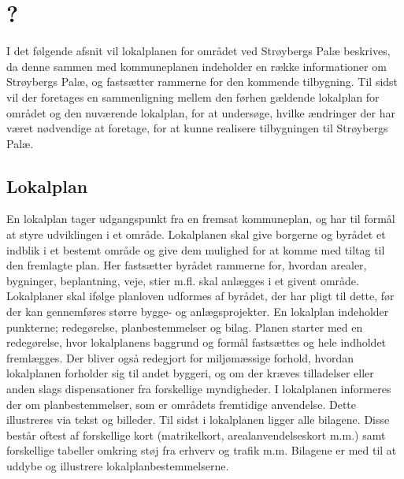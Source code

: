 \chapter{?}
I det følgende afsnit vil lokalplanen for området ved Strøybergs Palæ beskrives, da denne sammen med kommuneplanen indeholder en række informationer om Strøybergs Palæ, og fastsætter rammerne for den kommende tilbygning. 
\newline \indent{     }   Til sidst vil der foretages en sammenligning mellem den førhen gældende lokalplan for området og den nuværende lokalplan, for at undersøge, hvilke ændringer der har været nødvendige at foretage, for at kunne realisere tilbygningen til Strøybergs Palæ.


\section{Lokalplan}
En lokalplan tager udgangspunkt fra en fremsat kommuneplan, og har til formål at styre udviklingen i et område. Lokalplanen skal give borgerne og byrådet et indblik i et bestemt område og give dem mulighed for at komme med tiltag til den fremlagte plan. Her fastsætter byrådet rammerne for, hvordan arealer, bygninger, beplantning, veje, stier m.fl. skal anlægges i et givent område. Lokalplaner skal ifølge planloven udformes af byrådet, der har pligt til dette, før der kan gennemføres større bygge- og anlægsprojekter.
\newline
\newline
En lokalplan indeholder punkterne; redegørelse, planbestemmelser og bilag.
\newline \indent{     }  Planen starter med en redegørelse, hvor lokalplanens baggrund og formål fastsættes og hele indholdet fremlægges. Der bliver også redegjort for miljømæssige forhold, hvordan lokalplanen forholder sig til andet byggeri, og om der kræves tilladelser eller anden slags dispensationer fra forskellige myndigheder.  
\newline \indent{     }   I lokalplanen informeres der om planbestemmelser, som er områdets fremtidige anvendelse. Dette illustreres via tekst og billeder.
\newline \indent{     }  Til sidst i lokalplanen ligger alle bilagene. Disse består oftest af forskellige kort (matrikelkort, arealanvendelseskort m.m.) samt forskellige tabeller omkring støj fra erhverv og trafik m.m. Bilagene er med til at uddybe og illustrere lokalplanbestemmelserne.
\newline
\newline

